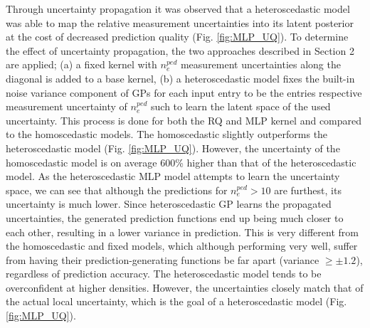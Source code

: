 \documentclass[a4paper, twoside, final, 12pt]{article}
\begin{document}
{Through uncertainty propagation it was observed that a heteroscedastic model was able to map the relative measurement uncertainties into its latent posterior at the cost of decreased prediction quality (Fig.  \ref{fig:MLP_UQ}). 
To determine the effect of uncertainty propagation, the two approaches described in Section 2 are applied; (a) a fixed kernel with $n_e^{ped}$ measurement uncertainties along the diagonal is added to a base kernel, (b) a heteroscedastic model fixes the built-in noise variance component of GPs for each input entry to be the entries respective measurement uncertainty of $n_e^{ped}$ such to learn the latent space of the used uncertainty. This process is done for both the RQ and MLP kernel and compared to the homoscedastic models.
The homoscedastic slightly outperforms the heteroscedastic model (Fig. \ref{fig:MLP_UQ}). However, the uncertainty of the homoscedastic model is on average 600\% higher than that of the heteroscedastic model. As the heteroscedastic MLP model attempts to learn the uncertainty space, we can see that although the predictions for $n_e^{ped} > 10$ are furthest, its uncertainty is much lower. Since heteroscedastic GP learns the propagated uncertainties, the generated prediction functions end up being much closer to each other, resulting in a lower variance in prediction. This is very different from the homoscedastic and fixed models, which although performing very well, suffer from having their prediction-generating functions be far apart (variance $ \geq \pm 1.2$), regardless of prediction accuracy. The heteroscedastic model tends to be overconfident at higher densities. However, the uncertainties closely match that of the actual local uncertainty, which is the goal of a heteroscedastic model (Fig. \ref{fig:MLP_UQ}).

}
\end{document}
